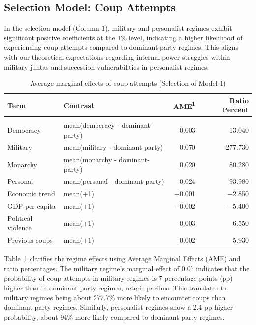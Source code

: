 \documentclass[
  12pt,
]{report}
\begin{document}
\subsection{Selection Model: Coup
Attempts}\label{selection-model-coup-attempts}

In the selection model (Column 1), military and personalist regimes
exhibit significant positive coefficients at the 1\% level, indicating a
higher likelihood of experiencing coup attempts compared to
dominant-party regimes. This aligns with our theoretical expectations
regarding internal power struggles within military juntas and succession
vulnerabilities in personalist regimes.

\begin{longtable}[]{@{}llrr@{}}

\caption{\label{tbl-mfx1}Average marginal effects of coup attempts
(Selection of Model 1)}

\tabularnewline

\toprule\noalign{}
Term & Contrast & AME{\textsuperscript{1}} & Ratio Percent \\
\midrule\noalign{}
\endhead
\midrule\noalign{}
\multicolumn{4}{@{}l@{}}{%
{\textsuperscript{1}} AME: Average Marginal Effect} \\
\bottomrule\noalign{}
\endlastfoot
Democracy & mean(democracy - dominant-party) & 0.003 & 13.040 \\
Military & mean(military - dominant-party) & 0.070 & 277.730 \\
Monarchy & mean(monarchy - dominant-party) & 0.020 & 80.280 \\
Personal & mean(personal - dominant-party) & 0.024 & 93.980 \\
Economic trend & mean(+1) & −0.001 & −2.850 \\
GDP per capita & mean(+1) & −0.002 & −5.400 \\
Political violence & mean(+1) & 0.003 & 6.550 \\
Previous coups & mean(+1) & 0.002 & 5.930 \\

\end{longtable}

Table~\ref{tbl-mfx1} clarifies the regime effects using Average Marginal
Effects (AME) and ratio percentages. The military regime's marginal
effect of 0.07 indicates that the probability of coup attempts in
military regimes is 7 percentage points (pp) higher than in
dominant-party regimes, ceteris paribus. This translates to military
regimes being about 277.7\% more likely to encounter coups than
dominant-party regimes. Similarly, personalist regimes show a 2.4 pp
higher probability, about 94\% more likely compared to dominant-party
regimes.
\end{document}
